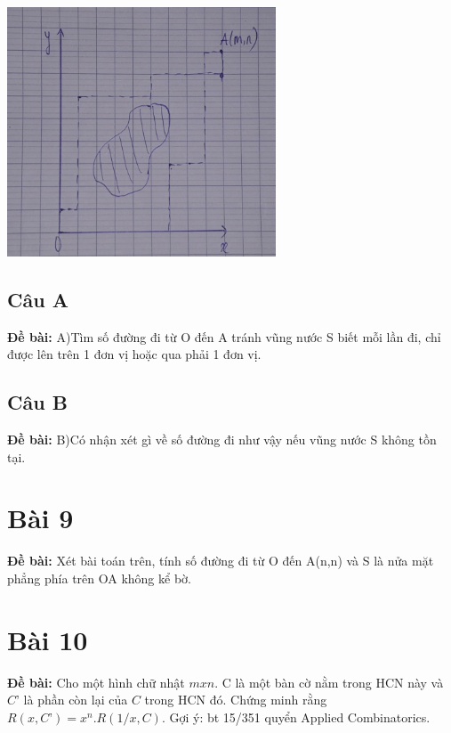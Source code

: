 \documentclass[12pt]{article}
\begin{document}
\begin{sloppypar}
\begin{center}
    {\includegraphics[width=8cm]{7.png}}
\end{center}

\subsection{Câu A}
\begin{tcolorbox}
    \textbf{Đề bài:} A)Tìm số đường đi từ O đến A tránh vũng nước S biết mỗi lần đi, chỉ được lên trên 1 đơn vị hoặc qua phải 1 đơn vị.
\end{tcolorbox}
\subsection{Câu B}
\begin{tcolorbox}
    \textbf{Đề bài:} B)Có nhận xét gì về số đường đi như vậy nếu vũng nước S không tồn tại.
\end{tcolorbox}

\section{Bài 9}
\begin{tcolorbox}
    \textbf{Đề bài:} Xét bài toán trên, tính số đường đi từ O đến A(n,n) và S là nửa mặt phẳng phía trên OA không kể bờ.
\end{tcolorbox}

\section{Bài 10}
\begin{tcolorbox}
    \textbf{Đề bài:} Cho một hình chữ nhật \(mxn\). C là một bàn cờ nằm trong HCN này và \(C’\) là phần còn lại của \(C\) trong HCN đó.
    Chứng minh rằng \(R(x,C’)=x^{n} .R(1/x,C)\). Gợi ý: bt 15/351 quyển Applied Combinatorics.
\end{tcolorbox}


\end{sloppypar}
\end{document}
